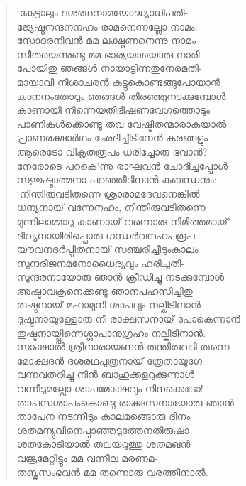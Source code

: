 \begin{verse}
‘കേട്ടാലും ദശരഥനാമയോദ്ധ്യാധിപതി-\\
ജ്യേഷ്ഠനന്ദനനഹം രാമനെന്നല്ലോ നാമം.\\
സോദരനിവന്‍ മമ ലക്ഷ്മണനെന്നു നാമം\\
സീതയെന്നുണ്ടു മമ ഭാര്യയായൊരു നാരി.\\
പോയിതു ഞങ്ങള്‍ നായാട്ടിന്നതുനേരമതി-\\
മായാവി നിശാചരന്‍ കട്ടുകൊണ്ടങ്ങുപോയാന്‍\\
കാനനംതോറും ഞങ്ങള്‍ തിരഞ്ഞുനടക്കുമ്പോള്‍\\
കാണായി നിന്നെയതിഭീഷണവേഗത്തൊടും\\
പാണികള്‍ക്കൊണ്ടു തവ വേഷ്ടിതന്മാരാകയാല്‍\\
പ്രാണരക്ഷാര്‍ഥം ഛേദിച്ചീടിനേന്‍ കരങ്ങളും\\
ആരെടോ വികൃതരൂപം ധരിച്ചോരു ഭവാന്‍?\\
നേരോടെ പറകെ’ന്നു രാഘവന്‍ ചോദിച്ചപ്പോള്‍\\
സന്തുഷ്ടാത്മനാ പറഞ്ഞീടിനാന്‍ കബന്ധനും:\\
‘നിന്തിരുവടിതന്നെ ശ്രാരാമദേവനെങ്കില്‍\\
ധന്യനായ് വന്നേനഹം, നിന്തിരുവടിതന്നെ\\
മുന്നിലാമ്മാറു കാണായ് വന്നൊരു നിമിത്തമായ്’\\
ദിവ്യനായിരിപ്പൊരു ഗന്ധര്‍വനഹം രൂപ-\\
യൗവനദര്‍പ്പിതനായ് സഞ്ചരിച്ചീടുംകാലം\\
സുന്ദരീജനമനോധൈര്യവും ഹരിച്ചതി-\\
സുന്ദരനായോരു ഞാന്‍ ക്രീഡിച്ചു നടക്കുമ്പോള്‍\\
അഷ്ടാവക്രനെക്കണ്ടു ഞാനപഹസിച്ചിതു\\
രുഷ്ടനായ് മഹാമുനി ശാപവും നല്കീടിനാന്‍\\
ദുഷ്ടനായുള്ളോരു നീ രാക്ഷസനായ് പോകെന്നാന്‍\\
തുഷ്ടനായ്പ്പിന്നെശ്ശാപാനുഗ്രഹം നല്കീടിനാന്‍.\\
സാക്ഷാല്‍ ശ്രീനാരായണന്‍ തന്തിരുവടി തന്നെ\\
മോക്ഷദന്‍ ദശരഥപുത്രനായ് ത്രേതായുഗേ\\
വന്നവതരിച്ചു നിന്‍ ബാഹുക്കളറുക്കുന്നാള്‍\\
വന്നീടുമല്ലോ ശാപമോക്ഷവും നിനക്കെടോ!\\
താപസശാപംകൊണ്ടു രാക്ഷസനായോരു ഞാന്‍\\
താപേന നടന്നീടും കാലമങ്ങൊരു ദിനം\\
ശതമന്യുവിനെപ്പാഞ്ഞടുത്തേനതിരുഷാ\\
ശതകോടിയാല്‍ തലയറുത്തു ശതമഖന്‍\\
വജ്രമേറ്റിട്ടും മമ വന്നീല മരണമ-\\
തബ്ജസംഭവന്‍ മമ തന്നൊരു വരത്തിനാല്‍.\\

\end{verse}

